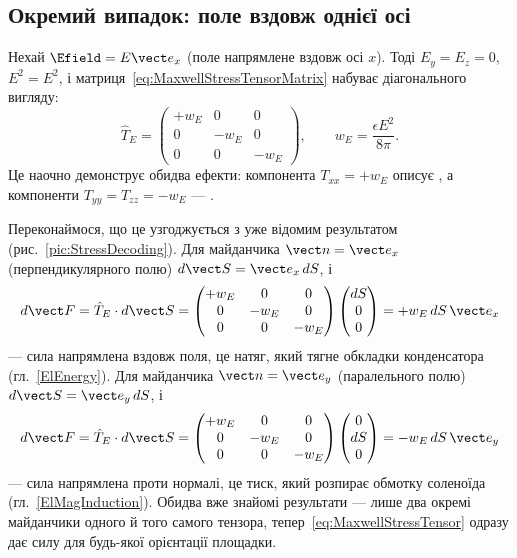 \subsection*{Окремий випадок: поле вздовж однієї осі}

Нехай $\Efield=E\vect e_x$ (поле напрямлене вздовж осі $x$). Тоді $E_y=E_z=0$, $E^2=E^2$, і матриця~\eqref{eq:MaxwellStressTensorMatrix}
набуває діагонального вигляду:
\begin{equation}\label{eq:StressDiagonal}
	\hat{T}_E =
	\begin{pmatrix}
		+w_E & 0 & 0 \\
		0 & -w_E & 0 \\
		0 & 0 & -w_E
	\end{pmatrix},
	\qquad w_E = \frac{\epsilon E^2}{8\pi}.
\end{equation}
Це наочно демонструє обидва ефекти: компонента $T_{xx}=+w_E$ описує , а компоненти $T_{yy}=T_{zz}=-w_E$ ---
.

Переконаймося, що це узгоджується з уже відомим результатом (рис.~\ref{pic:StressDecoding}). Для майданчика $\vect n=\vect e_x$
(перпендикулярного полю) $d\vect S=\vect e_x\,dS$, і
\begin{equation*}
	d\vect F = \hat{T}_E\cdot d\vect S =
	\begin{pmatrix}
		+w_E & 0 & 0 \\
		0 & -w_E & 0 \\
		0 & 0 & -w_E
	\end{pmatrix}
	\begin{pmatrix}
		dS \\ 0 \\ 0
	\end{pmatrix}
	= +w_E\,dS\,\vect e_x
\end{equation*}
--- сила напрямлена вздовж поля, це натяг, який тягне обкладки конденсатора (гл.~\ref{ElEnergy}). Для майданчика $\vect n=\vect e_y$
(паралельного полю) $d\vect S=\vect e_y\,dS$, і
\begin{equation*}
	d\vect F = \hat{T}_E\cdot d\vect S =
	\begin{pmatrix}
		+w_E & 0 & 0 \\
		0 & -w_E & 0 \\
		0 & 0 & -w_E
	\end{pmatrix}
	\begin{pmatrix}
		0 \\ dS \\ 0
	\end{pmatrix}
	= -w_E\,dS\,\vect e_y
\end{equation*}
--- сила напрямлена проти нормалі, це тиск, який розпирає обмотку соленоїда (гл.~\ref{ElMagInduction}). Обидва вже знайомі результати ---
лише два окремі майданчики одного й того самого тензора, тепер~\eqref{eq:MaxwellStressTensor} одразу дає силу для будь-якої орієнтації
площадки.

